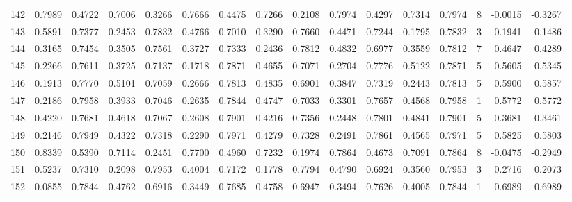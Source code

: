 \begin{tabular}{lrrrrrrrrrrrrrrr}
142 &      0.7989 &  0.4722 &  0.7006 &  0.3266 &  0.7666 &  0.4475 &  0.7266 &  0.2108 &  0.7974 &  0.4297 &   0.7314 &     0.7974 &      8 &                   -0.0015 &                    -0.3267 \\
143 &      0.5891 &  0.7377 &  0.2453 &  0.7832 &  0.4766 &  0.7010 &  0.3290 &  0.7660 &  0.4471 &  0.7244 &   0.1795 &     0.7832 &      3 &                    0.1941 &                     0.1486 \\
144 &      0.3165 &  0.7454 &  0.3505 &  0.7561 &  0.3727 &  0.7333 &  0.2436 &  0.7812 &  0.4832 &  0.6977 &   0.3559 &     0.7812 &      7 &                    0.4647 &                     0.4289 \\
145 &      0.2266 &  0.7611 &  0.3725 &  0.7137 &  0.1718 &  0.7871 &  0.4655 &  0.7071 &  0.2704 &  0.7776 &   0.5122 &     0.7871 &      5 &                    0.5605 &                     0.5345 \\
146 &      0.1913 &  0.7770 &  0.5101 &  0.7059 &  0.2666 &  0.7813 &  0.4835 &  0.6901 &  0.3847 &  0.7319 &   0.2443 &     0.7813 &      5 &                    0.5900 &                     0.5857 \\
147 &      0.2186 &  0.7958 &  0.3933 &  0.7046 &  0.2635 &  0.7844 &  0.4747 &  0.7033 &  0.3301 &  0.7657 &   0.4568 &     0.7958 &      1 &                    0.5772 &                     0.5772 \\
148 &      0.4220 &  0.7681 &  0.4618 &  0.7067 &  0.2608 &  0.7901 &  0.4216 &  0.7356 &  0.2448 &  0.7801 &   0.4841 &     0.7901 &      5 &                    0.3681 &                     0.3461 \\
149 &      0.2146 &  0.7949 &  0.4322 &  0.7318 &  0.2290 &  0.7971 &  0.4279 &  0.7328 &  0.2491 &  0.7861 &   0.4565 &     0.7971 &      5 &                    0.5825 &                     0.5803 \\
150 &      0.8339 &  0.5390 &  0.7114 &  0.2451 &  0.7700 &  0.4960 &  0.7232 &  0.1974 &  0.7864 &  0.4673 &   0.7091 &     0.7864 &      8 &                   -0.0475 &                    -0.2949 \\
151 &      0.5237 &  0.7310 &  0.2098 &  0.7953 &  0.4004 &  0.7172 &  0.1778 &  0.7794 &  0.4790 &  0.6924 &   0.3560 &     0.7953 &      3 &                    0.2716 &                     0.2073 \\
152 &      0.0855 &  0.7844 &  0.4762 &  0.6916 &  0.3449 &  0.7685 &  0.4758 &  0.6947 &  0.3494 &  0.7626 &   0.4005 &     0.7844 &      1 &                    0.6989 &                     0.6989 \\

\end{tabular}

